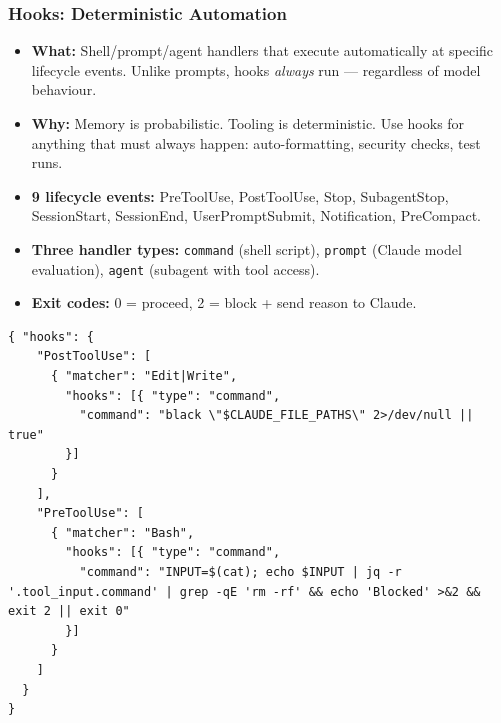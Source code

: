 \begin{frame}[fragile]\frametitle{Hooks: Deterministic Automation}
  \begin{itemize}
    \item \textbf{What:} Shell/prompt/agent handlers that execute automatically at specific lifecycle events. Unlike prompts, hooks \textit{always} run --- regardless of model behaviour.
    \item \textbf{Why:} Memory is probabilistic. Tooling is deterministic. Use hooks for anything that must always happen: auto-formatting, security checks, test runs.
    \item \textbf{9 lifecycle events:} PreToolUse, PostToolUse, Stop, SubagentStop, SessionStart, SessionEnd, UserPromptSubmit, Notification, PreCompact.
    \item \textbf{Three handler types:} \texttt{command} (shell script), \texttt{prompt} (Claude model evaluation), \texttt{agent} (subagent with tool access).
    \item \textbf{Exit codes:} 0 = proceed, 2 = block + send reason to Claude.
  \end{itemize}

\begin{lstlisting}
{ "hooks": {
    "PostToolUse": [
      { "matcher": "Edit|Write",
        "hooks": [{ "type": "command",
          "command": "black \"$CLAUDE_FILE_PATHS\" 2>/dev/null || true"
        }]
      }
    ],
    "PreToolUse": [
      { "matcher": "Bash",
        "hooks": [{ "type": "command",
          "command": "INPUT=$(cat); echo $INPUT | jq -r '.tool_input.command' | grep -qE 'rm -rf' && echo 'Blocked' >&2 && exit 2 || exit 0"
        }]
      }
    ]
  }
}
\end{lstlisting}
\end{frame}


